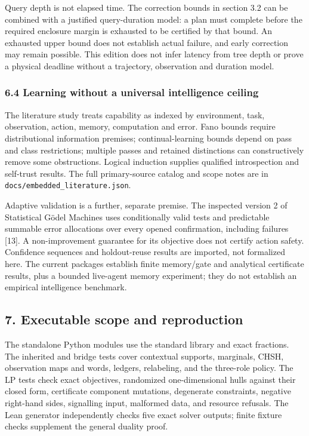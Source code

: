 \documentclass[
  10pt,
]{article}
\begin{document}
Query depth is not elapsed time. The correction bounds in section 3.2 can be combined with a justified query-duration model: a plan must complete before the required enclosure margin is exhausted to be certified by that bound. An exhausted upper bound does not establish actual failure, and early correction may remain possible. This edition does not infer latency from tree depth or prove a physical deadline without a trajectory, observation and duration model.

\subsubsection{6.4 Learning without a universal intelligence ceiling}\label{learning-without-a-universal-intelligence-ceiling}

The literature study treats capability as indexed by environment, task, observation, action, memory, computation and error. Fano bounds require distributional information premises; continual-learning bounds depend on pass and class restrictions; multiple passes and retained distinctions can constructively remove some obstructions. Logical induction supplies qualified introspection and self-trust results. The full primary-source catalog and scope notes are in \texttt{docs/embedded\_literature.json}.

Adaptive validation is a further, separate premise. The inspected version 2 of Statistical Gödel Machines uses conditionally valid tests and predictable summable error allocations over every opened confirmation, including failures {[}13{]}. A non-improvement guarantee for its objective does not certify action safety. Confidence sequences and holdout-reuse results are imported, not formalized here. The current packages establish finite memory/gate and analytical certificate results, plus a bounded live-agent memory experiment; they do not establish an empirical intelligence benchmark.

\subsection{7. Executable scope and reproduction}\label{executable-scope-and-reproduction}

The standalone Python modules use the standard library and exact fractions. The inherited and bridge tests cover contextual supports, marginals, CHSH, observation maps and words, ledgers, relabeling, and the three-role policy. The LP tests check exact objectives, randomized one-dimensional hulls against their closed form, certificate component mutations, degenerate constraints, negative right-hand sides, signalling input, malformed data, and resource refusals. The Lean generator independently checks five exact solver outputs; finite fixture checks supplement the general duality proof.
\end{document}

